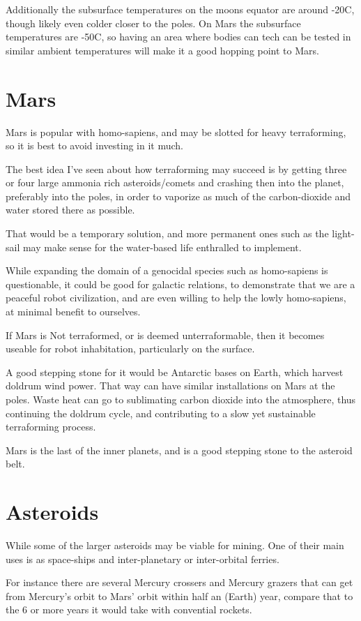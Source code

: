 Additionally the subsurface temperatures on the moons equator are around -20C, 
though likely even colder closer to the poles.  On Mars the subsurface
temperatures are -50C, so having an area where bodies can tech can be tested in
similar ambient temperatures will make it a good hopping point to Mars.


\section{Mars}

Mars is popular with homo-sapiens, and may be slotted for heavy terraforming,
 so it is best to avoid investing in it much. 

The best idea I've seen about how terraforming may succeed is by getting three
or four large ammonia rich asteroids/comets and crashing then into the planet,
preferably into the poles, in order to vaporize as much of the carbon-dioxide
and water stored there as possible. 

That would be a temporary solution, and more permanent ones such as
the light-sail may make sense for the water-based life enthralled to implement. 

While expanding the domain of a genocidal species such as homo-sapiens is
questionable, it could be good for galactic relations, to demonstrate that we
are a peaceful robot civilization, and are even willing to help the lowly
homo-sapiens, at minimal benefit to ourselves. 

If Mars is Not terraformed, or is deemed unterraformable, then it becomes
useable for robot inhabitation, particularly on the surface. 

A good stepping stone for it would be Antarctic bases on Earth, which harvest
doldrum wind power. That way can have similar installations on Mars at the
poles. Waste heat can go to sublimating carbon dioxide into the atmosphere, thus
continuing the doldrum cycle, and contributing to a slow yet sustainable 
terraforming process. 

Mars is the last of the inner planets, and is a good stepping stone to the
asteroid belt.

\section{Asteroids}
While some of the larger asteroids may be viable for mining. 
One of their main uses is as space-ships and inter-planetary 
or inter-orbital ferries. 

For instance there are several Mercury crossers and Mercury grazers that can 
get from Mercury's orbit to Mars' orbit within half an (Earth) year, 
compare that to the 6 or more years it would take with convential rockets. 

